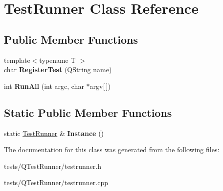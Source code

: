 \hypertarget{classTestRunner}{\section{Test\+Runner Class Reference}
\label{classTestRunner}
}
\subsection*{Public Member Functions}
\begin{DoxyCompactItemize}
\item 
\hypertarget{classTestRunner_affb5703febccf285914b08ce39e7396f}{{\footnotesize template$<$typename T $>$ }\\char {\bfseries Register\+Test} (Q\+String name)}\label{classTestRunner_affb5703febccf285914b08ce39e7396f}

\item 
\hypertarget{classTestRunner_a0a247b43d9154ab88b489051d22221e3}{int {\bfseries Run\+All} (int argc, char $\ast$argv\mbox{[}$\,$\mbox{]})}\label{classTestRunner_a0a247b43d9154ab88b489051d22221e3}

\end{DoxyCompactItemize}
\subsection*{Static Public Member Functions}
\begin{DoxyCompactItemize}
\item 
\hypertarget{classTestRunner_a4707c4680c85ce622fc375efcf39fc25}{static \hyperlink{classTestRunner}{Test\+Runner} \& {\bfseries Instance} ()}\label{classTestRunner_a4707c4680c85ce622fc375efcf39fc25}

\end{DoxyCompactItemize}


The documentation for this class was generated from the following files\+:\begin{DoxyCompactItemize}
\item 
tests/\+Q\+Test\+Runner/testrunner.\+h\item 
tests/\+Q\+Test\+Runner/testrunner.\+cpp\end{DoxyCompactItemize}
